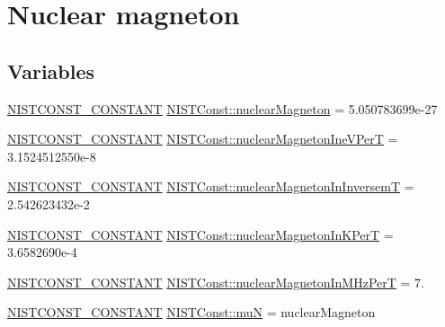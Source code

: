 \hypertarget{group___n_i_s_t_const-_nuclear_magneton}{}\section{Nuclear magneton}
\label{group___n_i_s_t_const-_nuclear_magneton}
\subsection*{Variables}
\begin{DoxyCompactItemize}
\item 
\mbox{\hyperlink{group___n_i_s_t_const-_macros_ga2b0fc1d7452373f816175dd86ce26729}{N\+I\+S\+T\+C\+O\+N\+S\+T\+\_\+\+C\+O\+N\+S\+T\+A\+NT}} \mbox{\hyperlink{group___n_i_s_t_const-_nuclear_magneton_ga7772e88568bba00c23575dcbe1e8b4da}{N\+I\+S\+T\+Const\+::nuclear\+Magneton}} = 5.\+050783699e-\/27
\item 
\mbox{\hyperlink{group___n_i_s_t_const-_macros_ga2b0fc1d7452373f816175dd86ce26729}{N\+I\+S\+T\+C\+O\+N\+S\+T\+\_\+\+C\+O\+N\+S\+T\+A\+NT}} \mbox{\hyperlink{group___n_i_s_t_const-_nuclear_magneton_gaac4f73b042846dbd18c8e86bf7ad40ad}{N\+I\+S\+T\+Const\+::nuclear\+Magneton\+Ine\+V\+PerT}} = 3.\+1524512550e-\/8
\item 
\mbox{\hyperlink{group___n_i_s_t_const-_macros_ga2b0fc1d7452373f816175dd86ce26729}{N\+I\+S\+T\+C\+O\+N\+S\+T\+\_\+\+C\+O\+N\+S\+T\+A\+NT}} \mbox{\hyperlink{group___n_i_s_t_const-_nuclear_magneton_ga95d787bf5e84f595d848ac5a565f9742}{N\+I\+S\+T\+Const\+::nuclear\+Magneton\+In\+InversemT}} = 2.\+542623432e-\/2
\item 
\mbox{\hyperlink{group___n_i_s_t_const-_macros_ga2b0fc1d7452373f816175dd86ce26729}{N\+I\+S\+T\+C\+O\+N\+S\+T\+\_\+\+C\+O\+N\+S\+T\+A\+NT}} \mbox{\hyperlink{group___n_i_s_t_const-_nuclear_magneton_ga020f8bcfb39741d79ca59735c9b75e8e}{N\+I\+S\+T\+Const\+::nuclear\+Magneton\+In\+K\+PerT}} = 3.\+6582690e-\/4
\item 
\mbox{\hyperlink{group___n_i_s_t_const-_macros_ga2b0fc1d7452373f816175dd86ce26729}{N\+I\+S\+T\+C\+O\+N\+S\+T\+\_\+\+C\+O\+N\+S\+T\+A\+NT}} \mbox{\hyperlink{group___n_i_s_t_const-_nuclear_magneton_ga777ba2ca7adede57181646fb23e7bfc5}{N\+I\+S\+T\+Const\+::nuclear\+Magneton\+In\+M\+Hz\+PerT}} = 7.
\item 
\mbox{\hyperlink{group___n_i_s_t_const-_macros_ga2b0fc1d7452373f816175dd86ce26729}{N\+I\+S\+T\+C\+O\+N\+S\+T\+\_\+\+C\+O\+N\+S\+T\+A\+NT}} \mbox{\hyperlink{group___n_i_s_t_const-_nuclear_magneton_ga2489f9762b0a9097d4a882609c12038a}{N\+I\+S\+T\+Const\+::muN}} = nuclear\+Magneton

\end{DoxyCompactItemize}
